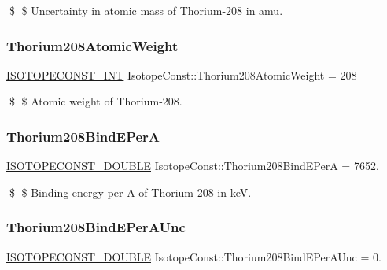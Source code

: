 \$ \$ Uncertainty in atomic mass of Thorium-\/208 in amu. \mbox{\label{group___isotope_const-_thorium-_th208_ga8170e78e50122ef9c0a07dd2231a8ce6}} 
\subsubsection{\texorpdfstring{Thorium208\+Atomic\+Weight}{Thorium208AtomicWeight}}
{\footnotesize\ttfamily \mbox{\hyperlink{group___isotope_const-_macros_ga5f18360b3e99483a35c32d789e62621c}{I\+S\+O\+T\+O\+P\+E\+C\+O\+N\+S\+T\+\_\+\+I\+NT}} Isotope\+Const\+::\+Thorium208\+Atomic\+Weight = 208}

\$ \$ Atomic weight of Thorium-\/208. \mbox{\label{group___isotope_const-_thorium-_th208_ga7f5242f8c13eafc1bc5d28e8e5a59b16}} 
\subsubsection{\texorpdfstring{Thorium208\+Bind\+E\+PerA}{Thorium208BindEPerA}}
{\footnotesize\ttfamily \mbox{\hyperlink{group___isotope_const-_macros_ga8f45a7272ce02c0b4c65c44636ed719a}{I\+S\+O\+T\+O\+P\+E\+C\+O\+N\+S\+T\+\_\+\+D\+O\+U\+B\+LE}} Isotope\+Const\+::\+Thorium208\+Bind\+E\+PerA = 7652.}

\$ \$ Binding energy per A of Thorium-\/208 in keV. \mbox{\label{group___isotope_const-_thorium-_th208_ga955628d4bf5530dea8bdc15b0e8cc01c}} 
\subsubsection{\texorpdfstring{Thorium208\+Bind\+E\+Per\+A\+Unc}{Thorium208BindEPerAUnc}}
{\footnotesize\ttfamily \mbox{\hyperlink{group___isotope_const-_macros_ga8f45a7272ce02c0b4c65c44636ed719a}{I\+S\+O\+T\+O\+P\+E\+C\+O\+N\+S\+T\+\_\+\+D\+O\+U\+B\+LE}} Isotope\+Const\+::\+Thorium208\+Bind\+E\+Per\+A\+Unc = 0.}


